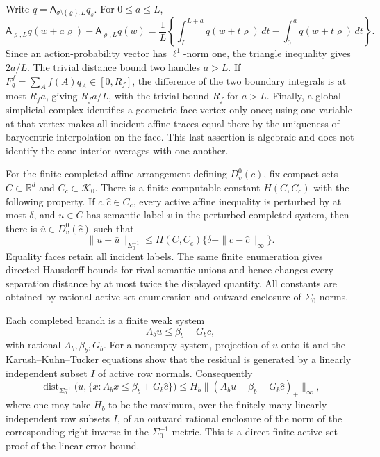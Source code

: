 Write \(q=\mathsf A_{\sigma\setminus\{\varrho\},L}q_s\). For \(0\le a\le L\),
\[
 \mathsf A_{\varrho,L}q(w+a\varrho)-\mathsf A_{\varrho,L}q(w)
 =\frac1L\left\{\int_L^{L+a}q(w+t\varrho)\,dt-
 \int_0^aq(w+t\varrho)\,dt\right\}.
\]
Since an action-probability vector has \(\ell^1\)-norm one, the triangle inequality gives \(2a/L\). The trivial distance bound two handles \(a>L\). If \(F_q^f=\sum_Af(A)q_A\in[0,R_f]\), the difference of the two boundary integrals is at most \(R_fa\), giving \(R_fa/L\), with the trivial bound \(R_f\) for \(a>L\). Finally, a global simplicial complex identifies a geometric face vertex only once; using one variable at that vertex makes all incident affine traces equal there by the uniqueness of barycentric interpolation on the face. This last assertion is algebraic and does not identify the cone-interior averages with one another.

For the finite completed affine arrangement defining \(D_v^0(c)\), fix compact sets \(C\subset\mathbb R^d\) and \(C_c\subset\mathcal K_0\). There is a finite computable constant \(H(C,C_c)\) with the following property. If \(c,\widehat c\in C_c\), every active affine inequality is perturbed by at most \(\delta\), and \(u\in C\) has semantic label \(v\) in the perturbed completed system, then there is \(\bar u\in D_v^0(\widehat c)\) such that
\[
 \|u-\bar u\|_{\Sigma_0^{-1}}
 \le H(C,C_c)\{\delta+\|c-\widehat c\|_\infty\}.
\]
Equality faces retain all incident labels. The same finite enumeration gives directed Hausdorff bounds for rival semantic unions and hence changes every separation distance by at most twice the displayed quantity. All constants are obtained by rational active-set enumeration and outward enclosure of \(\Sigma_0\)-norms.

Each completed branch is a finite weak system
\[
 A_bu\le \beta_b+G_bc,
\]
with rational \(A_b,\beta_b,G_b\). For a nonempty system, projection of \(u\) onto it and the Karush--Kuhn--Tucker equations show that the residual is generated by a linearly independent subset \(I\) of active row normals. Consequently
\[
 \operatorname{dist}_{\Sigma_0^{-1}}
 \bigl(u,\{x:A_bx\le\beta_b+G_b\widehat c\}\bigr)
 \le H_b\bigl\|(A_bu-\beta_b-G_b\widehat c)_+\bigr\|_\infty,
\]
where one may take \(H_b\) to be the maximum, over the finitely many linearly independent row subsets \(I\), of an outward rational enclosure of the norm of the corresponding right inverse in the \(\Sigma_0^{-1}\) metric. This is a direct finite active-set proof of the linear error bound.

